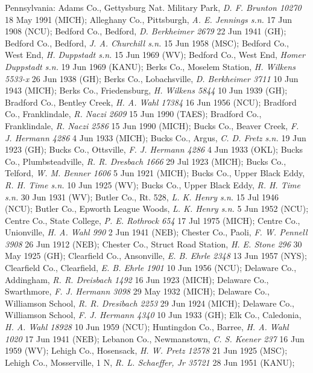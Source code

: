 \documentclass{article}
\begin{document}
Pennsylvania:
Adams Co., Gettysburg Nat. Military Park, \textit{D. F. Brunton 10270} 18 May 1991 (MICH);
Alleghany Co., Pittsburgh, \textit{A. E. Jennings s.n.} 17 Jun 1908 (NCU);
Bedford Co., Bedford, \textit{D. Berkheimer 2679} 22 Jun 1941 (GH);
Bedford Co., Bedford, \textit{J. A. Churchill s.n.} 15 Jun 1958 (MSC);
Bedford Co., West End, \textit{H. Duppstadt s.n.} 15 Jun 1969 (WV);
Bedford Co., West End, \textit{Homer Duppstadt s.n.} 19 Jun 1969 (KANU);
Berks Co., Moselem Station, \textit{H. Wilkens 5533-x} 26 Jun 1938 (GH);
Berks Co., Lobachsville, \textit{D. Berkheimer 3711} 10 Jun 1943 (MICH);
Berks Co., Friedensburg, \textit{H. Wilkens 5844} 10 Jun 1939 (GH);
Bradford Co., Bentley Creek, \textit{H. A. Wahl 17384} 16 Jun 1956 (NCU);
Bradford Co., Franklindale, \textit{R. Naczi 2609} 15 Jun 1990 (TAES);
Bradford Co., Franklindale, \textit{R. Naczi 2586} 15 Jun 1990 (MICH);
Bucks Co., Beaver Creek, \textit{F. J. Hermann 4286} 4 Jun 1933 (MICH);
Bucks Co., Argus, \textit{C. D. Fretz s.n.} 19 Jun 1923 (GH);
Bucks Co., Ottsville, \textit{F. J. Hermann 4286} 4 Jun 1933 (OKL);
Bucks Co., Plumbsteadville, \textit{R. R. Dresbach 1666} 29 Jul 1923 (MICH);
Bucks Co., Telford, \textit{W. M. Benner 1606} 5 Jun 1921 (MICH);
Bucks Co., Upper Black Eddy, \textit{R. H. Time s.n.} 10 Jun 1925 (WV);
Bucks Co., Upper Black Eddy, \textit{R. H. Time s.n.} 30 Jun 1931 (WV);
Butler Co., Rt. 528, \textit{L. K. Henry s.n.} 15 Jul 1946 (NCU);
Butler Co., Epworth League Woods, \textit{L. K. Henry s.n.} 5 Jun 1952 (NCU);
Centre Co., State College, \textit{P. E. Rothrock 654} 17 Jul 1975 (MICH);
Centre Co., Unionville, \textit{H. A. Wahl 990} 2 Jun 1941 (NEB);
Chester Co., Paoli, \textit{F. W. Pennell 3908} 26 Jun 1912 (NEB);
Chester Co., Struct Road Station, \textit{H. E. Stone 296} 30 May 1925 (GH);
Clearfield Co., Ansonville, \textit{E. B. Ehrle 2348} 13 Jun 1957 (NYS);
Clearfield Co., Clearfield, \textit{E. B. Ehrle 1901} 10 Jun 1956 (NCU);
Delaware Co., Addingham, \textit{R. R. Dreisbach 1492} 16 Jun 1923 (MICH);
Delaware Co., Swarthmore, \textit{F. J. Hermann 3098} 29 May 1932 (MICH);
Delaware Co., Williamson School, \textit{R. R. Dresibach 2253} 29 Jun 1924 (MICH);
Delaware Co., Williamson School, \textit{F. J. Hermann 4340} 10 Jun 1933 (GH);
Elk Co., Caledonia, \textit{H. A. Wahl 18928} 10 Jun 1959 (NCU);
Huntingdon Co., Barree, \textit{H. A. Wahl 1020} 17 Jun 1941 (NEB);
Lebanon Co., Newmanstown, \textit{C. S. Keener 237} 16 Jun 1959 (WV);
Lehigh Co., Hosensack, \textit{H. W. Pretz 12578} 21 Jun 1925 (MSC);
Lehigh Co., Mosserville, 1 N, \textit{R. L. Schaeffer, Jr 35721} 28 Jun 1951 (KANU);
\end{document}
